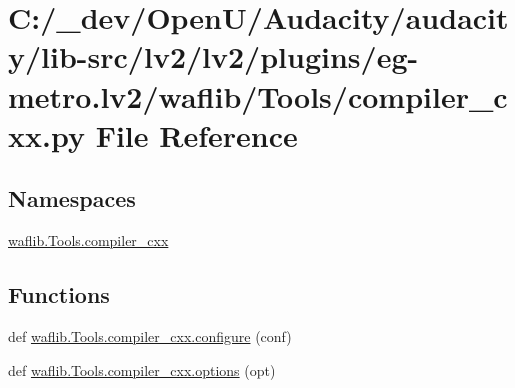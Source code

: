 \hypertarget{lv2_2plugins_2eg-metro_8lv2_2waflib_2_tools_2compiler__cxx_8py}{}\section{C\+:/\+\_\+dev/\+Open\+U/\+Audacity/audacity/lib-\/src/lv2/lv2/plugins/eg-\/metro.lv2/waflib/\+Tools/compiler\+\_\+cxx.py File Reference}
\label{lv2_2plugins_2eg-metro_8lv2_2waflib_2_tools_2compiler__cxx_8py}
\subsection*{Namespaces}
\begin{DoxyCompactItemize}
\item 
 \hyperlink{namespacewaflib_1_1_tools_1_1compiler__cxx}{waflib.\+Tools.\+compiler\+\_\+cxx}
\end{DoxyCompactItemize}
\subsection*{Functions}
\begin{DoxyCompactItemize}
\item 
def \hyperlink{namespacewaflib_1_1_tools_1_1compiler__cxx_a0788b7c415a9fd34ea0f3f575fe60db3}{waflib.\+Tools.\+compiler\+\_\+cxx.\+configure} (conf)
\item 
def \hyperlink{namespacewaflib_1_1_tools_1_1compiler__cxx_a26997eea0edf25e3990533d4011a38e5}{waflib.\+Tools.\+compiler\+\_\+cxx.\+options} (opt)
\end{DoxyCompactItemize}
